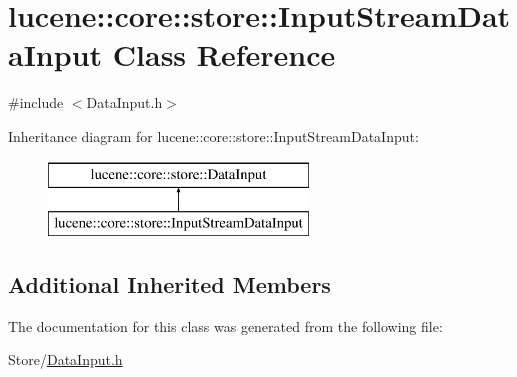 \hypertarget{classlucene_1_1core_1_1store_1_1InputStreamDataInput}{}\section{lucene\+:\+:core\+:\+:store\+:\+:Input\+Stream\+Data\+Input Class Reference}
\label{classlucene_1_1core_1_1store_1_1InputStreamDataInput}


{\ttfamily \#include $<$Data\+Input.\+h$>$}

Inheritance diagram for lucene\+:\+:core\+:\+:store\+:\+:Input\+Stream\+Data\+Input\+:\begin{figure}[H]
\begin{center}
\leavevmode
\includegraphics[height=2.000000cm]{classlucene_1_1core_1_1store_1_1InputStreamDataInput}
\end{center}
\end{figure}
\subsection*{Additional Inherited Members}


The documentation for this class was generated from the following file\+:\begin{DoxyCompactItemize}
\item 
Store/\mbox{\hyperlink{DataInput_8h}{Data\+Input.\+h}}\end{DoxyCompactItemize}
